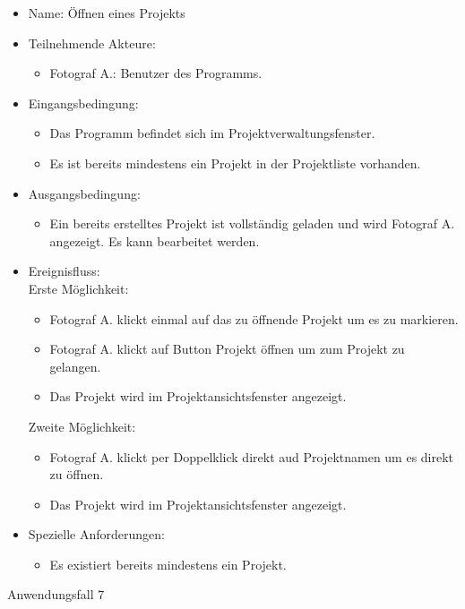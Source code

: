 		\begin{itemize}
			\item Name: Öffnen eines Projekts
			\item Teilnehmende Akteure:
			\begin{itemize}
				\item	Fotograf A.: Benutzer des Programms.		
			\end{itemize}
			\item Eingangsbedingung:
			\begin{itemize}
				\item	Das Programm befindet sich im Projektverwaltungsfenster.
				\item Es ist bereits mindestens ein Projekt in der Projektliste vorhanden.
			\end{itemize}
			\item Ausgangsbedingung:
			\begin{itemize}
				\item	Ein bereits erstelltes Projekt ist vollständig geladen und wird Fotograf A. angezeigt. Es kann bearbeitet werden.		
			\end{itemize}
			\item Ereignisfluss:\\Erste Möglichkeit:
			\begin{itemize}
				\item Fotograf A. klickt einmal auf das zu öffnende Projekt um es zu markieren.
				\item Fotograf A. klickt auf Button Projekt öffnen um zum Projekt zu gelangen.
				\item Das Projekt wird im Projektansichtsfenster angezeigt.
			\end{itemize}
			Zweite Möglichkeit:
			\begin{itemize}
				\item Fotograf A. klickt per Doppelklick direkt aud Projektnamen um es direkt zu öffnen.
				\item Das Projekt wird im Projektansichtsfenster angezeigt.					
			\end{itemize}
			\item Spezielle Anforderungen:
			\begin{itemize}
				\item	Es existiert bereits mindestens ein Projekt.	
			\end{itemize}			
		\end{itemize}
		
	\begin{description}
		\item[Anwendungsfall 7]
	\end{description}
	
